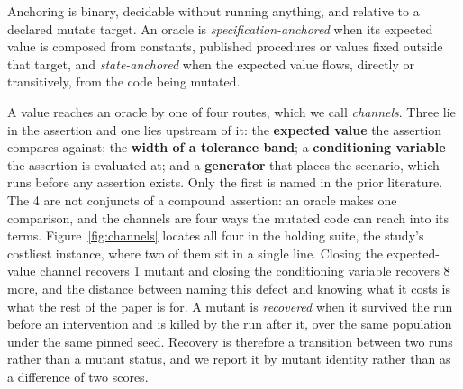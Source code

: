 \documentclass[12pt]{article}
\begin{document}
Anchoring is binary, decidable without running anything, and relative to a declared
mutate target. An oracle is \emph{specification-anchored} when its expected value is
composed from constants, published procedures or values fixed outside that target,
and \emph{state-anchored} when the expected value flows, directly or transitively,
from the code being mutated.

A value reaches an oracle by one of four routes, which we call \emph{channels}.
Three lie in the assertion and one lies upstream of it: the \textbf{expected value}
the assertion compares against; the \textbf{width of a tolerance band}; a
\textbf{conditioning variable} the assertion is evaluated at; and a
\textbf{generator} that places the scenario, which runs before any assertion
exists. Only the first is named in the prior literature. The 4 are not conjuncts
of a compound assertion: an oracle makes one comparison, and the channels are four
ways the mutated code can reach into its terms. Figure~\ref{fig:channels} locates
all four in the holding suite, the study's costliest instance, where two of them
sit in a single line. Closing the expected-value channel recovers 1 mutant and closing the conditioning variable recovers 8 more, and the distance between naming this defect and knowing what it costs is what the rest of the paper is for. A mutant is \emph{recovered} when it survived the run before an intervention and is killed by the run after it, over the same population under the same pinned seed. Recovery is therefore a transition between two runs rather than a mutant status, and we report it by mutant identity rather than as a difference of two scores.
\end{document}
